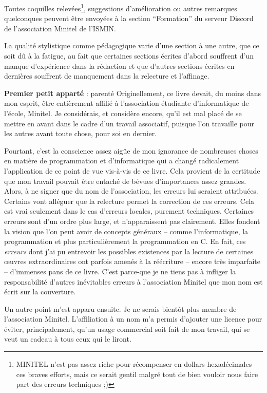 \documentclass[../main.tex]{subfiles}
\begin{document}
Toutes coquilles relevées\footnote{MINITEL n'est pas assez riche pour récompenser en dollars hexadécimales ces braves efforts, mais ce serait gentil malgré tout de bien vouloir nous faire part des erreurs techniques ;)}, suggestions d'amélioration ou autres remarques quelconques peuvent être envoyées à la section ``Formation'' du serveur Discord de l'association Minitel de l'ISMIN.

La qualité stylistique comme pédagogique varie d'une section à une autre, que ce soit dû à la fatigue, au fait que certaines sections écrites d'abord souffrent d'un manque d'expérience dans la rédaction et que d'autres sections écrites en dernières souffrent de manquement dans la relecture et l'affinage.

\begin{minitelbasicbox}{\textbf{Premier petit apparté} : parenté}
Originellement, ce livre devait, du moins dans mon esprit, être entièrement affilié à l'association étudiante d'informatique de l'école, Minitel. Je considérais, et considère encore, qu'il est mal placé de se mettre en avant dans le cadre d'un travail associatif, puisque l'on travaille pour les autres avant toute chose, pour soi en dernier.

Pourtant, c'est la conscience assez aigüe de mon ignorance de nombreuses choses en matière de programmation et d'informatique qui a changé radicalement l'application de ce point de vue vis-à-vis de ce livre. Cela provient de la certitude que mon travail pouvait être entaché de bévues d'importances assez grandes. Alors, à ne signer que du nom de l'association, les erreurs lui seraient attribuées. Certains vont alléguer que la relecture permet la correction de ces erreurs. Cela est vrai seulement dans le cas d'erreurs locales, purement techniques. Certaines erreurs sont d'un ordre plus large, et n'apparaissent pas clairement. Elles fondent la vision que l'on peut avoir de concepts généraux -- comme l'informatique, la programmation et plus particulièrement la programmation en C. En fait, ces \textit{erreurs} dont j'ai pu entrevoir les possibles existences par la lecture de certaines \oe{}uvres extraordinaires \cite{EoP}\cite{TAOCP} ont parfois amenés à la réécriture -- encore très imparfaite -- d'immenses pans de ce livre. C'est parce-que je ne tiens pas à infliger la responsabilité d'autres inévitables erreurs à l'association Minitel que mon nom est écrit sur la couverture.

Un autre point m'est apparu ensuite. Je ne serais bientôt plus membre de l'association Minitel. L'affiliation à un nom m'a permis d'ajouter une licence pour éviter, principalement, qu'un usage commercial soit fait de mon travail, qui se veut un cadeau à tous ceux qui le liront. 
\end{minitelbasicbox}
\end{document}
